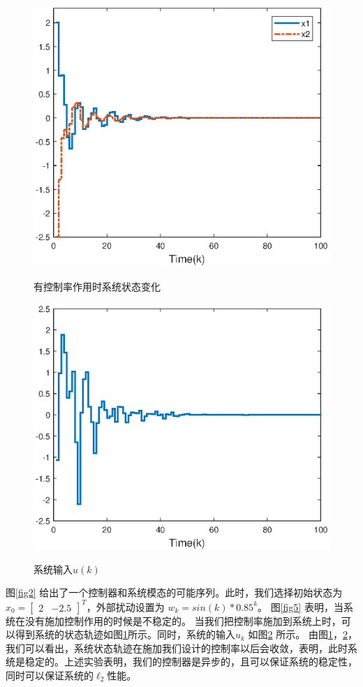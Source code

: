 \begin{figure}[!htb]
	\centering\includegraphics[scale=0.6]{./figures/lure_system/state4.eps}\\
	\caption{有控制率作用时系统状态变化}
	\label{fig3}
\end{figure}
\begin{figure}[!htb]
	\centering\includegraphics[scale=0.6]{./figures/lure_system/u_k3.eps}\\ 
	\caption{系统输入$u(k)$}
	\label{fig4}
\end{figure}
图\ref{fig2} 给出了一个控制器和系统模态的可能序列。此时，我们选择初始状态为 $x_{0}=\begin{bmatrix}
2&-2.5
\end{bmatrix}^{T}$，外部扰动设置为 $w_{k} = sin(k)*0.85^{k}$。 图\ref{fig5} 表明，当系统在没有施加控制作用的时候是不稳定的。 当我们把控制率施加到系统上时，可以得到系统的状态轨迹如图\ref{fig3}所示。同时，系统的输入$u_{k}$ 如图\ref{fig4} 所示。 由图\ref{fig3}，\ref{fig4}， 我们可以看出，系统状态轨迹在施加我们设计的控制率以后会收敛，表明，此时系统是稳定的。上述实验表明，我们的控制器是异步的，且可以保证系统的稳定性，同时可以保证系统的$\ell_2$性能。


